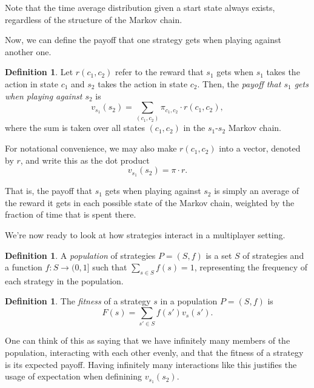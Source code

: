\documentclass[12pt]{article}
\theoremstyle{definition}
\newtheorem{definition}[theorem]{Definition}
\theoremstyle{remark}
\begin{document}
Note that the time average distribution given a start state always exists, regardless of the structure of the Markov chain.

Now, we can define the payoff that one strategy gets when playing against another one.

\begin{definition}
  \label{payofftimeaverage}
  Let $r(c_1, c_2)$ refer to the reward that $s_1$ gets when $s_1$ takes the action in state $c_1$ and $s_2$ takes the action in state $c_2$. Then, the \textit{payoff that $s_1$ gets when playing against $s_2$} is
  \begin{equation*}
    v_{s_1}(s_2) = \sum_{(c_1,c_2)} \pi_{c_1,c_2} \cdot r(c_1, c_2),
  \end{equation*}
  where the sum is taken over all states $(c_1,c_2)$ in the $s_1$-$s_2$ Markov chain.
\end{definition}

For notational convenience, we may also make $r(c_1, c_2)$ into a vector, denoted by $r$, and write this as the dot product \begin{equation*}
  v_{s_1}(s_2) = \pi \cdot r.
\end{equation*}

That is, the payoff that $s_1$ gets when playing against $s_2$ is simply an average of the reward it gets in each possible state of the Markov chain, weighted by the fraction of time that is spent there.

We're now ready to look at how strategies interact in a multiplayer setting.

\begin{definition}
  A \textit{population} of strategies $P = (S, f)$ is a set $S$ of strategies and a function $f : S \to (0,1]$ such that $\sum_{s \in S} f(s) = 1$, representing the frequency of each strategy in the population.
\end{definition}

\begin{definition}
  The \textit{fitness} of a strategy $s$ in a population $P = (S, f)$ is \begin{equation*}
    F(s) = \sum_{s' \in S} f(s') v_s(s').
  \end{equation*}
\end{definition}

One can think of this as saying that we have infinitely many members of the population, interacting with each other evenly, and that the fitness of a strategy is its expected payoff. Having infinitely many interactions like this justifies the usage of expectation when definining $v_{s_1}(s_2)$.
\end{document}
